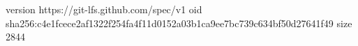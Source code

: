 version https://git-lfs.github.com/spec/v1
oid sha256:c4e1fcece2af1322f254fa4f11d0152a03b1ca9ee7bc739c634bf50d27641f49
size 2844
